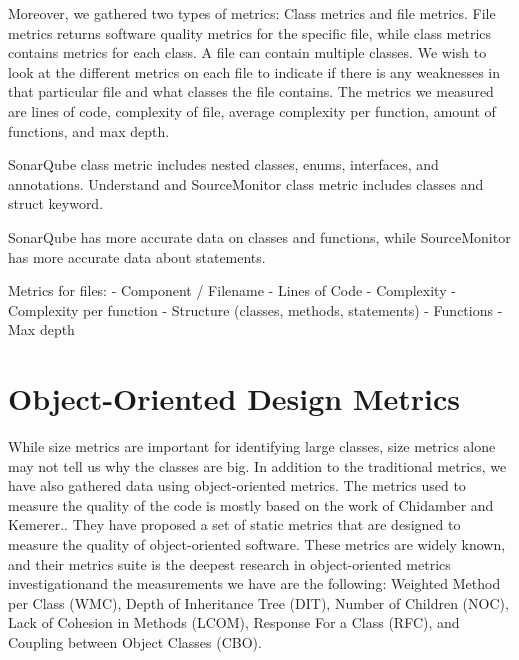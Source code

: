 


Moreover, we gathered two types of metrics: Class metrics and file metrics. File metrics returns software quality metrics for the specific file, while class metrics contains metrics for each class. A file can contain multiple classes. We wish to look at the different metrics on each file to indicate if there is any weaknesses in that particular file and what classes the file contains. The metrics we measured are lines of code, complexity of file, average complexity per function, amount of functions, and max depth. 

SonarQube class metric includes nested classes, enums, interfaces, and annotations. Understand and SourceMonitor class metric includes classes and struct keyword. 

SonarQube has more accurate data on classes and functions, while SourceMonitor has more accurate data about statements. 






Metrics for files:
- Component / Filename
- Lines of Code
- Complexity
- Complexity per function
- Structure (classes, methods, statements)
- Functions
- Max depth






\section{Object-Oriented Design Metrics}
While size metrics are important for identifying large classes, size metrics alone may not tell us why the classes are big. In addition to the traditional metrics, we have also gathered data using object-oriented metrics. The metrics used to measure the quality of the code is mostly based on the work of Chidamber and Kemerer.\cite{chidamber1994metrics}. They have proposed a set of static metrics that are designed to measure the quality of object-oriented software. These metrics are widely known, and their metrics suite is the deepest research in object-oriented metrics investigationand the measurements we have are the following: Weighted Method per Class (WMC), Depth of Inheritance Tree (DIT), Number of Children (NOC), Lack of Cohesion in Methods (LCOM), Response For a Class (RFC), and Coupling between Object Classes (CBO). 


